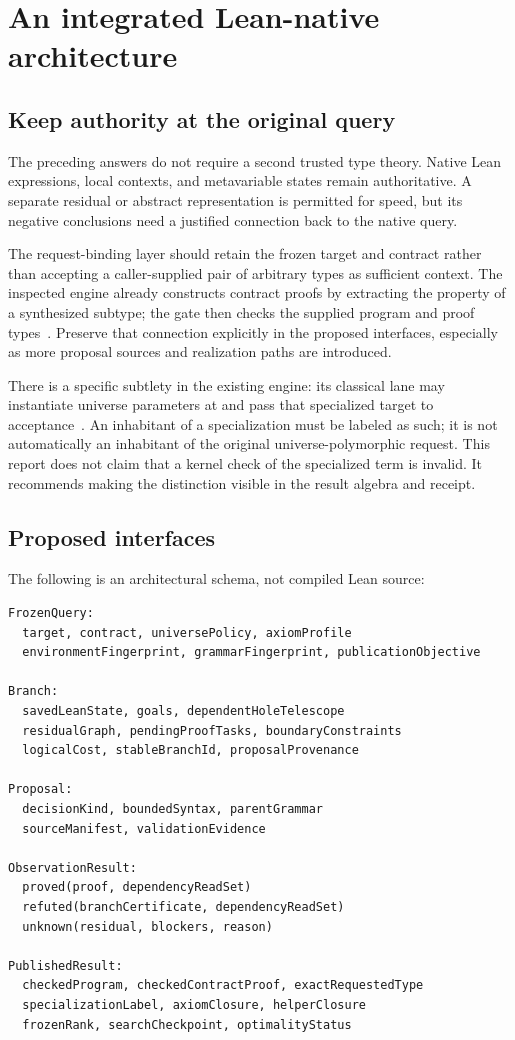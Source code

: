 \documentclass[11pt,a4paper]{article}
\theoremstyle{definition}
\theoremstyle{remark}
\newcommand{\code}[1]{\texttt{\detokenize{#1}}}
\begin{document}
\section{An integrated Lean-native architecture}\label{sec:architecture}

\subsection{Keep authority at the original query}
The preceding answers do not require a second trusted type theory. Native
Lean expressions, local contexts, and metavariable states remain authoritative.
A separate residual or abstract representation is permitted for speed, but
its negative conclusions need a justified connection back to the native query.

The request-binding layer should retain the frozen target and contract rather
than accepting a caller-supplied pair of arbitrary types as sufficient context.
The inspected engine already constructs contract proofs by extracting the
property of a synthesized subtype; the gate then checks the supplied program
and proof types~\cite{implementation}. Preserve that connection explicitly in
the proposed interfaces, especially as more proposal sources and realization
paths are introduced.

There is a specific subtlety in the existing engine: its classical lane may
instantiate universe parameters at \code{Prop} and pass that specialized target
to acceptance~\cite{implementation}. An inhabitant of a specialization must be
labeled as such; it is not automatically an inhabitant of the original
universe-polymorphic request. This report does not claim that a kernel check
of the specialized term is invalid. It recommends making the distinction
visible in the result algebra and receipt.

\subsection{Proposed interfaces}
The following is an architectural schema, not compiled Lean source:
\begin{lstlisting}
FrozenQuery:
  target, contract, universePolicy, axiomProfile
  environmentFingerprint, grammarFingerprint, publicationObjective

Branch:
  savedLeanState, goals, dependentHoleTelescope
  residualGraph, pendingProofTasks, boundaryConstraints
  logicalCost, stableBranchId, proposalProvenance

Proposal:
  decisionKind, boundedSyntax, parentGrammar
  sourceManifest, validationEvidence

ObservationResult:
  proved(proof, dependencyReadSet)
  refuted(branchCertificate, dependencyReadSet)
  unknown(residual, blockers, reason)

PublishedResult:
  checkedProgram, checkedContractProof, exactRequestedType
  specializationLabel, axiomClosure, helperClosure
  frozenRank, searchCheckpoint, optimalityStatus
\end{lstlisting}
\end{document}
